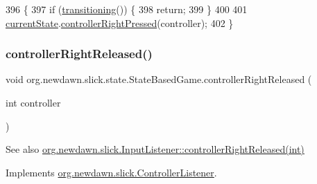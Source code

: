 \begin{DoxyCode}
396                                                        \{
397         \textcolor{keywordflow}{if} (\mbox{\hyperlink{classorg_1_1newdawn_1_1slick_1_1state_1_1_state_based_game_ae869c08778875776081935a090d4c92f}{transitioning}}()) \{
398             \textcolor{keywordflow}{return};
399         \}
400         
401         \mbox{\hyperlink{classorg_1_1newdawn_1_1slick_1_1state_1_1_state_based_game_a6a45e68094bb9b7ec30b8a8b7d415766}{currentState}}.\mbox{\hyperlink{interfaceorg_1_1newdawn_1_1slick_1_1_controller_listener_ae4ac64996df9778c4987705275792780}{controllerRightPressed}}(controller);
402     \}
\end{DoxyCode}
\mbox{\label{classorg_1_1newdawn_1_1slick_1_1state_1_1_state_based_game_a6bcf1a21902e2d05a6c8f7d14f575264}} 
\subsubsection{\texorpdfstring{controller\+Right\+Released()}{controllerRightReleased()}}
{\footnotesize\ttfamily void org.\+newdawn.\+slick.\+state.\+State\+Based\+Game.\+controller\+Right\+Released (\begin{DoxyParamCaption}\item[{int}]{controller }\end{DoxyParamCaption})\hspace{0.3cm}{\ttfamily [inline]}}

\begin{DoxySeeAlso}{See also}
\mbox{\hyperlink{interfaceorg_1_1newdawn_1_1slick_1_1_controller_listener_a33ee418e010e69783169b3f52fb62c3b}{org.\+newdawn.\+slick.\+Input\+Listener\+::controller\+Right\+Released(int)}} 
\end{DoxySeeAlso}


Implements \mbox{\hyperlink{interfaceorg_1_1newdawn_1_1slick_1_1_controller_listener_a33ee418e010e69783169b3f52fb62c3b}{org.\+newdawn.\+slick.\+Controller\+Listener}}.


